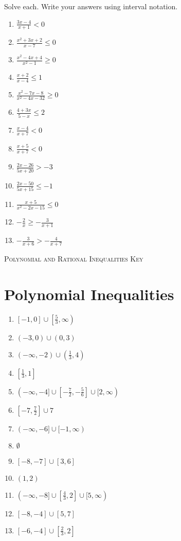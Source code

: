 Solve each. Write your answers using interval notation.
\begin{multicols}{3}
\begin{enumerate}
\setlength\itemsep{10pt}
\item $\frac{3x-4}{x+1}<0$
\item $\frac{x^2+3x+2}{x-7} \leq 0$
\item $\frac{x^2-4x+4}{x^2-1} \geq 0$
\item $\frac{x+2}{x-4} \leq 1$
\item $\frac{x^2-7x-8}{x^2-4x-32} \geq 0$
\item $\frac{4+3x}{5-x} \leq 2$
\item $\frac{x-4}{x+7} < 0$
\item $\frac{x+5}{x+7} < 0$
\item $\frac{2x-26}{5x+20} > -3$
\item $\frac{2x-50}{5x+15} \leq -1$
\item $\frac{x+5}{x^2-2x-15} \leq 0$
\item $-\frac{2}{x} \geq - \frac{3}{x+1}$
\item $-\frac{3}{x+6} > -\frac{4}{x+7}$
\end{enumerate}
\end{multicols}

\newpage

\textsc{Polynomial and Rational Inequalities Key}

\section*{Polynomial Inequalities}
\begin{multicols}{2}
\begin{enumerate}
    \item $[-1,0] \cup \left[\frac{5}{3}, \infty\right)$
    \item $(-3,0) \cup (0,3)$
    \item $(-\infty, -2) \cup \left(\frac{1}{3}, 4\right)$
    \item $\left[\frac{1}{3}, 1\right]$
    \item $(-\infty, -4] \cup \left[-\frac{7}{2},-\frac{5}{6}\right] \cup [2, \infty)$
    \item $\left[-7, \frac{7}{2}\right] \cup {7}$
    \item $(-\infty, -6] \cup [-1, \infty)$
    \item $\emptyset$
    \item $[-8,-7] \cup [3, 6]$
    \item $(1,2)$
    \item $(-\infty, -8] \cup \left[\frac{4}{3}, 2\right] \cup [5, \infty)$
    \item $[-8, -4] \cup [5, 7]$
    \item $[-6, -4] \cup \left[\frac{2}{3}, 2\right]$
\end{enumerate}
\end{multicols}

